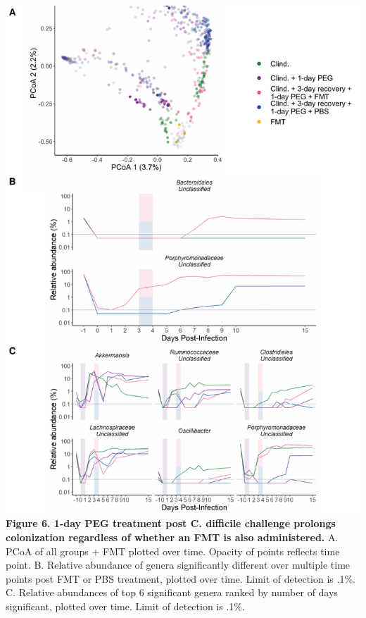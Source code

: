 \documentclass[
  11pt,
]{article}
\begin{document}
\newpage

\includegraphics{figure_6.pdf} \textbf{Figure 6. 1-day PEG treatment
post C. difficile challenge prolongs colonization regardless of whether
an FMT is also administered.} A. PCoA of all groups + FMT plotted over
time. Opacity of points reflects time point. B. Relative abundance of
genera significantly different over multiple time points post FMT or PBS
treatment, plotted over time. Limit of detection is .1\%. C. Relative
abundances of top 6 significant genera ranked by number of days
significant, plotted over time. Limit of detection is .1\%.

\newpage
\end{document}
